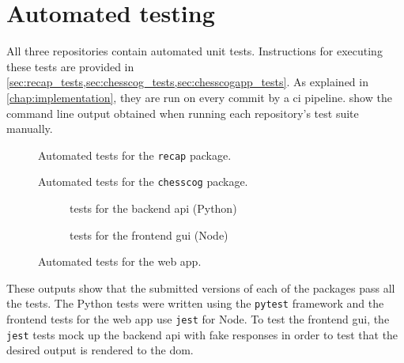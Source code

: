 \documentclass[../../report.tex]{subfiles}
\begin{document}
\section{Automated testing}
All three repositories contain automated unit tests.
Instructions for executing these tests are provided in \cref{sec:recap_tests,sec:chesscog_tests,sec:chesscogapp_tests}.
As explained in \cref{chap:implementation}, they are run on every commit by a \gls{ci} pipeline.
 show the command line output obtained when running each repository's test suite manually.
\begin{figure}
    
    \caption{Automated tests for the \texttt{recap} package.}
    \label{fig:tests_recap}
\end{figure}%
\begin{figure}
    
    \caption{Automated tests for the \texttt{chesscog} package.}
    \label{fig:tests_chesscog}
\end{figure}%
\begin{figure}
    \begin{subfigure}[b]{\textwidth}
        
        \caption{tests for the backend \acs{api} (Python)}
    \end{subfigure}
    \bigskip\par
    \begin{subfigure}[b]{\textwidth}
        
        \caption{tests for the frontend \acs{gui} (Node)}
    \end{subfigure}
    \caption{Automated tests for the web app.}
    \label{fig:tests_chesscogapp}
\end{figure}%
These outputs show that the submitted versions of each of the packages pass all the tests.
The Python tests were written using the \texttt{pytest} framework and the frontend tests for the web app use \texttt{jest} for Node.
To test the frontend \gls{gui}, the \texttt{jest} tests mock up the backend \gls{api} with fake responses in order to test that the desired output is rendered to the \gls{dom}.
\end{document}
